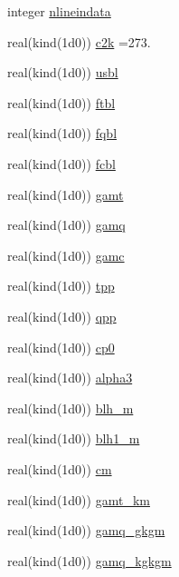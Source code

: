 \begin{DoxyCompactItemize}
integer \hyperlink{namespacecbl__module_a5f768f5aae74fa7b0c2d66118fc71ba5}{nlineindata}
\item 
real(kind(1d0)) \hyperlink{namespacecbl__module_a295b5b9a6a2d8808cba5c386dd4ed2e6}{c2k} =273.
\item 
real(kind(1d0)) \hyperlink{namespacecbl__module_ac165fc78c97d6f5f81b06c8282165aa0}{usbl}
\item 
real(kind(1d0)) \hyperlink{namespacecbl__module_a9096ed1c586fe2526affe44bdc6a3506}{ftbl}
\item 
real(kind(1d0)) \hyperlink{namespacecbl__module_a976e376b24178298356c3ffba35082f8}{fqbl}
\item 
real(kind(1d0)) \hyperlink{namespacecbl__module_abece0fd4503899af7cb75b51be8b5e63}{fcbl}
\item 
real(kind(1d0)) \hyperlink{namespacecbl__module_ab55715333b9dc4e5699d418ce9aa6eca}{gamt}
\item 
real(kind(1d0)) \hyperlink{namespacecbl__module_a2f0b130ab9a329454293c11707b4f89f}{gamq}
\item 
real(kind(1d0)) \hyperlink{namespacecbl__module_a999c82d729d623cf9e734d5b8f60413b}{gamc}
\item 
real(kind(1d0)) \hyperlink{namespacecbl__module_a32c6cd32a6011ce9ce3536df1935b6ba}{tpp}
\item 
real(kind(1d0)) \hyperlink{namespacecbl__module_a532658820cffbe2b75b727fb9e55d779}{qpp}
\item 
real(kind(1d0)) \hyperlink{namespacecbl__module_a01651700bba3680529190559891e308f}{cp0}
\item 
real(kind(1d0)) \hyperlink{namespacecbl__module_ab09c1f0f6b67d7bdf17278e617fc35ba}{alpha3}
\item 
real(kind(1d0)) \hyperlink{namespacecbl__module_a20477a72c625deb14eccf5e2cd767d95}{blh\+\_\+m}
\item 
real(kind(1d0)) \hyperlink{namespacecbl__module_a19dd722436e710830c7ff6b961753c62}{blh1\+\_\+m}
\item 
real(kind(1d0)) \hyperlink{namespacecbl__module_ab5d6f31d2f9b523336fb0947a1e53707}{cm}
\item 
real(kind(1d0)) \hyperlink{namespacecbl__module_a86a03f05040f82f59951951ed8feb92d}{gamt\+\_\+km}
\item 
real(kind(1d0)) \hyperlink{namespacecbl__module_a6aab251dd8f51c9cd6a8dc723a99fdf3}{gamq\+\_\+gkgm}
\item 
real(kind(1d0)) \hyperlink{namespacecbl__module_a1ce0de96513d92e7be4a7b0318a7102a}{gamq\+\_\+kgkgm}
\item 

\end{DoxyCompactItemize}
